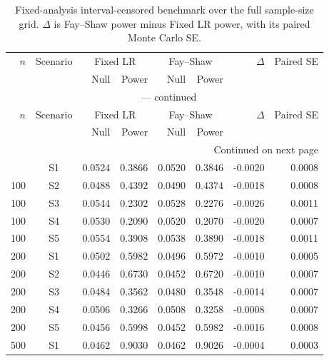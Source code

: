 \documentclass[12pt]{article}
\theoremstyle{definition}
\theoremstyle{remark}
\begin{document}
\clearpage
\begingroup
\scriptsize
\setlength{\tabcolsep}{4pt}
\renewcommand{\arraystretch}{1.10}
\setlength{\LTcapwidth}{\textwidth}
\begin{longtable}{rcrrrrrr}
\caption{Fixed-analysis interval-censored benchmark over the full sample-size grid. $\Delta$ is Fay--Shaw power minus Fixed LR power, with its paired Monte Carlo SE.}\label{tab:app-ic-benchmark}\\
\toprule
$n$ & Scenario & \multicolumn{2}{c}{Fixed LR} & \multicolumn{2}{c}{Fay--Shaw} & $\Delta$ & Paired SE \\
 &  & Null & Power & Null & Power & & \\
\midrule
\endfirsthead
\multicolumn{8}{c}{\tablename\ \thetable{} --- continued}\\
\toprule
$n$ & Scenario & \multicolumn{2}{c}{Fixed LR} & \multicolumn{2}{c}{Fay--Shaw} & $\Delta$ & Paired SE \\
 &  & Null & Power & Null & Power & & \\
\midrule
\endhead
\midrule
\multicolumn{8}{r}{Continued on next page}\\
\endfoot
\bottomrule
\endlastfoot
100 & S1 & 0.0524 & 0.3866 & 0.0520 & 0.3846 & -0.0020 & 0.0008 \\
100 & S2 & 0.0488 & 0.4392 & 0.0490 & 0.4374 & -0.0018 & 0.0008 \\
100 & S3 & 0.0544 & 0.2302 & 0.0528 & 0.2276 & -0.0026 & 0.0011 \\
100 & S4 & 0.0530 & 0.2090 & 0.0520 & 0.2070 & -0.0020 & 0.0007 \\
100 & S5 & 0.0554 & 0.3908 & 0.0538 & 0.3890 & -0.0018 & 0.0011 \\
200 & S1 & 0.0502 & 0.5982 & 0.0496 & 0.5972 & -0.0010 & 0.0005 \\
200 & S2 & 0.0446 & 0.6730 & 0.0452 & 0.6720 & -0.0010 & 0.0007 \\
200 & S3 & 0.0484 & 0.3562 & 0.0480 & 0.3548 & -0.0014 & 0.0007 \\
200 & S4 & 0.0506 & 0.3266 & 0.0508 & 0.3258 & -0.0008 & 0.0007 \\
200 & S5 & 0.0456 & 0.5998 & 0.0452 & 0.5982 & -0.0016 & 0.0008 \\
500 & S1 & 0.0462 & 0.9030 & 0.0462 & 0.9026 & -0.0004 & 0.0003 \\

\end{longtable}
\end{document}
